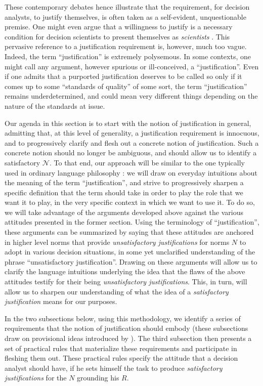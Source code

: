 \documentclass[preprint, french, english, 11pt, authoryear]{elsarticle}%
\newcommand{\adv}{\mathscr{N}}
\begin{document}
These contemporary debates hence illustrate that the requirement, for decision analysts, to justify themselves, is often taken as a self-evident, unquestionable premise. One might even argue that a willingness to justify is a necessary condition for decision scientists to present themselves as \emph{scientists} \citep{ormerod_justifying_2010}. This pervasive reference to a justification requirement is, however, much too vague. Indeed, the term ``justification'' is extremely polysemous. In some contexts, one might call any argument, however spurious or ill-conceived, a ``justification''. Even if one admits that a purported justification deserves to be called so only if it comes up to some ``standards of quality'' of some sort, the term ``justification'' remains underdetermined, and could mean very different things depending on the nature of the standards at issue.

Our agenda in this section is to start with the notion of justification in general, admitting that, at this level of generality, a justification requirement is innocuous, and to progressively clarify and flesh out a concrete notion of justification. Such a concrete notion should no longer be ambiguous, and should allow us to identify a satisfactory $\adv$. To that end, our approach will be similar to the one typically used in ordinary language philosophy \citep{soames_philosophical_2003}: we will draw on everyday intuitions about the meaning of the term ``justification'', and strive to progressively sharpen a specific definition that the term should take in order to play the role that we want it to play, in the very specific context in which we want to use it. To do so, we will take advantage of the arguments developed above against the various attitudes presented in the former section. Using the terminology of ``justification'', these arguments can be summarized by saying that these attitudes are anchored in higher level norms that provide \emph{unsatisfactory justifications} for norms $N$ to adopt in various decision situations, in some yet unclarified understanding of the phrase ``unsatisfactory justification''. Drawing on these arguments will allow us to clarify the language intuitions underlying the idea that the flaws of the above attitudes testify for their being \emph{unsatisfactory justifications}. This, in turn, will allow us to sharpen our understanding of what the idea of a \emph{satisfactory justification} means for our purposes.

In the two subsections below, using this methodology, we identify a series of requirements that the notion of justification should embody (these subsections draw on provisional ideas introduced by \citet{meinard_du_2013, meinard_what_2017}). The third subsection then presents a set of practical rules that materialize these requirements and participate in fleshing them out. These practical rules specify the attitude that a decision analyst should have, if he sets himself the task to produce \emph{satisfactory justifications} for the $N$ grounding his $R$.
\end{document}
